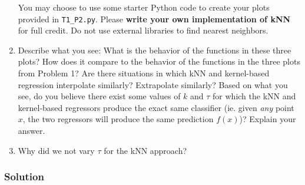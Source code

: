 \documentclass[submit]{harvardml}
\begin{document}
\begin{problem}
\begin{enumerate}
  You may choose to use some starter Python code to create your plots
  provided in \verb|T1_P2.py|.  Please \textbf{write your own
    implementation of kNN} for full credit.  Do not use external
  libraries to find nearest neighbors.
  
\item Describe what you see: What is the behavior of the functions in
  these three plots?  How does it compare to the behavior of the
  functions in the three plots from Problem 1?  Are there situations
  in which kNN and kernel-based regression interpolate similarly?
  Extrapolate similarly?  Based on what you see, do you believe there
  exist some values of $k$ and $\tau$ for which the kNN and kernel-based regressors produce the exact same classifier (ie. given \textit{any} point $x$, the two regressors will produce the same prediction $f(x)$)? Explain your answer.
  
\item Why did we not vary $\tau$ for the kNN approach?

\end{enumerate}

\end{problem}

\newpage
\subsubsection*{Solution}
\end{document}
